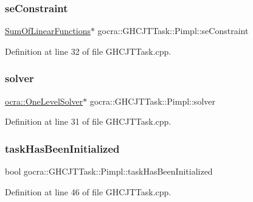 \subsubsection{\texorpdfstring{se\+Constraint}{seConstraint}}
{\footnotesize\ttfamily \hyperlink{classocra_1_1SumOfLinearFunctions}{Sum\+Of\+Linear\+Functions}$\ast$ gocra\+::\+G\+H\+C\+J\+T\+Task\+::\+Pimpl\+::se\+Constraint}



Definition at line 32 of file G\+H\+C\+J\+T\+Task.\+cpp.

\hypertarget{structgocra_1_1GHCJTTask_1_1Pimpl_ac9f3b5650e8663982f631c354a25e3b9}{}\label{structgocra_1_1GHCJTTask_1_1Pimpl_ac9f3b5650e8663982f631c354a25e3b9} 
\subsubsection{\texorpdfstring{solver}{solver}}
{\footnotesize\ttfamily \hyperlink{classocra_1_1OneLevelSolver}{ocra\+::\+One\+Level\+Solver}$\ast$ gocra\+::\+G\+H\+C\+J\+T\+Task\+::\+Pimpl\+::solver}



Definition at line 31 of file G\+H\+C\+J\+T\+Task.\+cpp.

\hypertarget{structgocra_1_1GHCJTTask_1_1Pimpl_ad07475df136dd26fc89634fa6dd9a9b7}{}\label{structgocra_1_1GHCJTTask_1_1Pimpl_ad07475df136dd26fc89634fa6dd9a9b7} 
\subsubsection{\texorpdfstring{task\+Has\+Been\+Initialized}{taskHasBeenInitialized}}
{\footnotesize\ttfamily bool gocra\+::\+G\+H\+C\+J\+T\+Task\+::\+Pimpl\+::task\+Has\+Been\+Initialized}



Definition at line 46 of file G\+H\+C\+J\+T\+Task.\+cpp.

\hypertarget{structgocra_1_1GHCJTTask_1_1Pimpl_a0ae67b26b52f69987d41bc3232636ccb}{}\label{structgocra_1_1GHCJTTask_1_1Pimpl_a0ae67b26b52f69987d41bc3232636ccb} 
